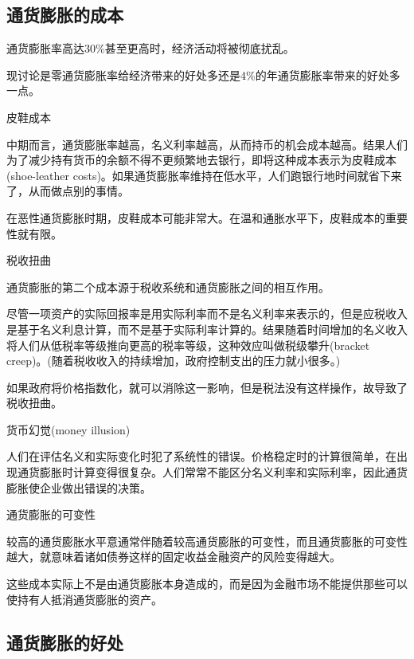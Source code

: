 \documentclass{article}
\begin{document}
\subsection{通货膨胀的成本}

通货膨胀率高达30\%甚至更高时，经济活动将被彻底扰乱。

现讨论是零通货膨胀率给经济带来的好处多还是4\%的年通货膨胀率带来的好处多一点。

\hspace*{\fill}

皮鞋成本

中期而言，通货膨胀率越高，名义利率越高，从而持币的机会成本越高。结果人们为了减少持有货币的余额不得不更频繁地去银行，即将这种成本表示为皮鞋成本(shoe-leather costs)。如果通货膨胀率维持在低水平，人们跑银行地时间就省下来了，从而做点别的事情。

在恶性通货膨胀时期，皮鞋成本可能非常大。在温和通胀水平下，皮鞋成本的重要性就有限。

\hspace*{\fill}

税收扭曲

通货膨胀的第二个成本源于税收系统和通货膨胀之间的相互作用。

尽管一项资产的实际回报率是用实际利率而不是名义利率来表示的，但是应税收入是基于名义利息计算，而不是基于实际利率计算的。结果随着时间增加的名义收入将人们从低税率等级推向更高的税率等级，这种效应叫做税级攀升(bracket creep)。(随着税收收入的持续增加，政府控制支出的压力就小很多。)

如果政府将价格指数化，就可以消除这一影响，但是税法没有这样操作，故导致了税收扭曲。

\hspace*{\fill}

货币幻觉(money illusion)

人们在评估名义和实际变化时犯了系统性的错误。价格稳定时的计算很简单，在出现通货膨胀时计算变得很复杂。人们常常不能区分名义利率和实际利率，因此通货膨胀使企业做出错误的决策。

\hspace*{\fill}

通货膨胀的可变性

较高的通货膨胀水平意通常伴随着较高通货膨胀的可变性，而且通货膨胀的可变性越大，就意味着诸如债券这样的固定收益金融资产的风险变得越大。

这些成本实际上不是由通货膨胀本身造成的，而是因为金融市场不能提供那些可以使持有人抵消通货膨胀的资产。

\subsection{通货膨胀的好处}
\end{document}
